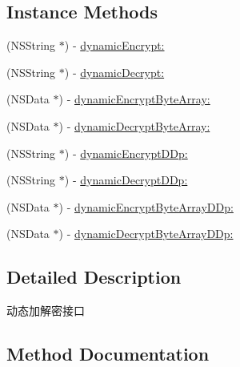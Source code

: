 \subsection*{Instance Methods}
\begin{DoxyCompactItemize}
\item 
(N\+S\+String $\ast$) -\/ \mbox{\hyperlink{protocol_i_open_dynamic_data_encrypt_component_01-p_a673a3c7262b0df36b23f1f87de4b88f7}{dynamic\+Encrypt\+:}}
\item 
(N\+S\+String $\ast$) -\/ \mbox{\hyperlink{protocol_i_open_dynamic_data_encrypt_component_01-p_aa740ebfde04ace023172eef6c4ab61a9}{dynamic\+Decrypt\+:}}
\item 
(N\+S\+Data $\ast$) -\/ \mbox{\hyperlink{protocol_i_open_dynamic_data_encrypt_component_01-p_a23f5f84ed74270a4c5c58ee93f5d8a5c}{dynamic\+Encrypt\+Byte\+Array\+:}}
\item 
(N\+S\+Data $\ast$) -\/ \mbox{\hyperlink{protocol_i_open_dynamic_data_encrypt_component_01-p_af7a8dc67724c51fbf71df38e0fb74f93}{dynamic\+Decrypt\+Byte\+Array\+:}}
\item 
(N\+S\+String $\ast$) -\/ \mbox{\hyperlink{protocol_i_open_dynamic_data_encrypt_component_01-p_aec61b5430eb3d1aa60d5e1ec986f4340}{dynamic\+Encrypt\+D\+Dp\+:}}
\item 
(N\+S\+String $\ast$) -\/ \mbox{\hyperlink{protocol_i_open_dynamic_data_encrypt_component_01-p_a9efd30d160d5b6a2a8006686dd44a88a}{dynamic\+Decrypt\+D\+Dp\+:}}
\item 
(N\+S\+Data $\ast$) -\/ \mbox{\hyperlink{protocol_i_open_dynamic_data_encrypt_component_01-p_a93a13fcc8e85a2d2a19616837b869575}{dynamic\+Encrypt\+Byte\+Array\+D\+Dp\+:}}
\item 
(N\+S\+Data $\ast$) -\/ \mbox{\hyperlink{protocol_i_open_dynamic_data_encrypt_component_01-p_ab0dc4e509c95acb3268290cbec0a4bd3}{dynamic\+Decrypt\+Byte\+Array\+D\+Dp\+:}}
\end{DoxyCompactItemize}


\subsection{Detailed Description}
动态加解密接口 

\subsection{Method Documentation}
\mbox{\label{protocol_i_open_dynamic_data_encrypt_component_01-p_aa740ebfde04ace023172eef6c4ab61a9}} 
